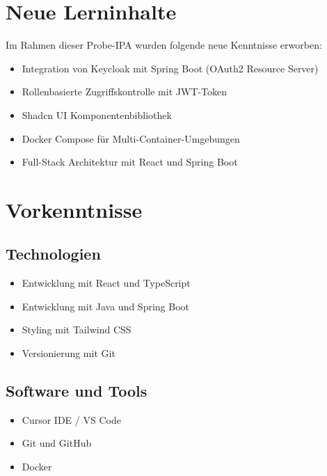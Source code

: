\documentclass[a4paper,12pt,twoside]{report}
\begin{document}
\newpage

\section{Neue Lerninhalte}

Im Rahmen dieser Probe-IPA wurden folgende neue Kenntnisse erworben:
\begin{itemize}
    \item Integration von Keycloak mit Spring Boot (OAuth2 Resource Server)
    \item Rollenbasierte Zugriffskontrolle mit JWT-Token
    \item Shadcn UI Komponentenbibliothek
    \item Docker Compose für Multi-Container-Umgebungen
    \item Full-Stack Architektur mit React und Spring Boot
\end{itemize}

\section{Vorkenntnisse}

\subsection{Technologien}
\begin{itemize}
    \item Entwicklung mit React und TypeScript
    \item Entwicklung mit Java und Spring Boot
    \item Styling mit Tailwind CSS
    \item Versionierung mit Git
\end{itemize}

\subsection{Software und Tools}
\begin{itemize}
    \item Cursor IDE / VS Code
    \item Git und GitHub
    \item Docker
\end{itemize}

\newpage
\end{document}
